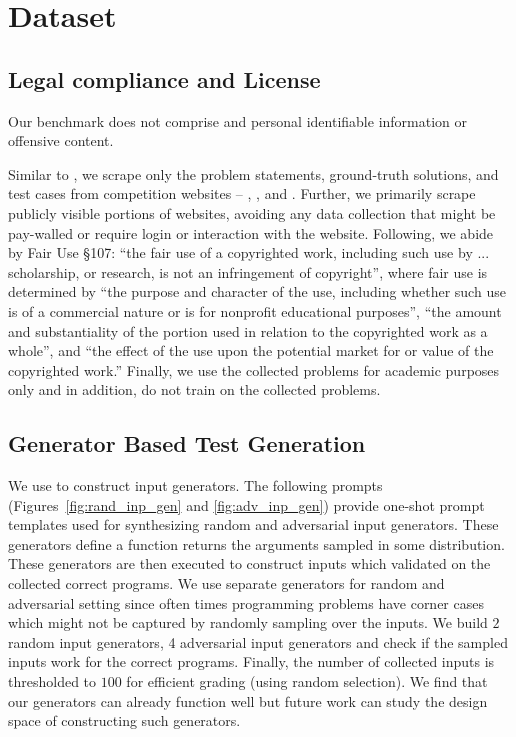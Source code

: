 \section{Dataset}
\label{app:sec:dataset}

\subsection{Legal compliance and License}
Our benchmark does not comprise and personal identifiable information or offensive content.

Similar to \citep{hendrycks2021measuring}, we scrape only the problem statements, ground-truth solutions, and test cases from competition websites -- \leetcode{}, \atcoder{}, and \codeforces{}. 
Further, we primarily scrape publicly visible portions of websites, avoiding any data collection that might be pay-walled or require login or interaction with the website.
Following, \citep{hendrycks2021measuring} we abide by Fair Use §107: “the fair
use of a copyrighted work, including such use by ... scholarship, or research, is not an infringement
of copyright”, where fair use is determined by “the purpose and character of the use, including
whether such use is of a commercial nature or is for nonprofit educational purposes”, “the amount
and substantiality of the portion used in relation to the copyrighted work as a whole”, and “the effect
of the use upon the potential market for or value of the copyrighted work.” 
Finally, we use the collected problems for academic purposes only and in addition, do not train on the collected problems.



\subsection{Generator Based Test Generation}
\label{appendix:input-generators}
We use \gptfourturbo{} to construct input generators. 
The following prompts (Figures~\ref{fig:rand_inp_gen} and \ref{fig:adv_inp_gen}) provide one-shot prompt templates used for synthesizing random and adversarial input generators.
These generators define a function returns the arguments sampled in some distribution.
These generators are then executed to construct inputs which validated on the collected correct programs.
We use separate generators for random and adversarial setting since often times programming problems have corner cases which might not be captured by randomly sampling over the inputs. We build $2$ random input generators, 4 adversarial input generators and check if the sampled inputs work for the correct programs. Finally, the number of collected inputs is thresholded to $100$ for efficient grading (using random selection). We find that our generators can already function well but future work can study the design space of constructing such generators. 


